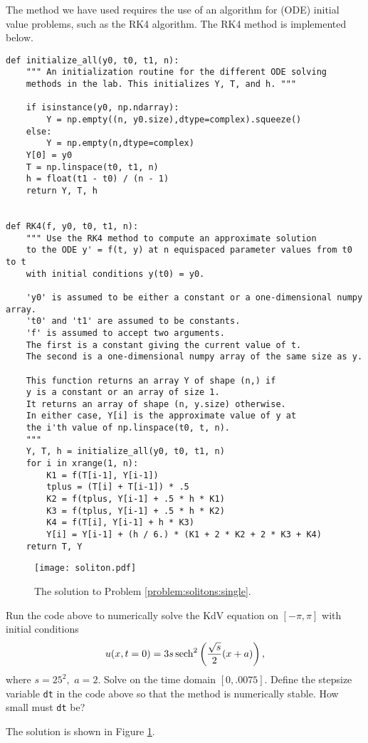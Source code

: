The method we have used requires the use of an algorithm for (ODE) initial value problems, such as the RK4 algorithm. The RK4 method is implemented below.
\begin{lstlisting}
def initialize_all(y0, t0, t1, n):
	""" An initialization routine for the different ODE solving
	methods in the lab. This initializes Y, T, and h. """
	
	if isinstance(y0, np.ndarray):
		Y = np.empty((n, y0.size),dtype=complex).squeeze()
	else:
		Y = np.empty(n,dtype=complex)
	Y[0] = y0
	T = np.linspace(t0, t1, n)
	h = float(t1 - t0) / (n - 1)
	return Y, T, h


def RK4(f, y0, t0, t1, n):
	""" Use the RK4 method to compute an approximate solution
	to the ODE y' = f(t, y) at n equispaced parameter values from t0 to t
	with initial conditions y(t0) = y0.
	
	'y0' is assumed to be either a constant or a one-dimensional numpy array.
	't0' and 't1' are assumed to be constants.
	'f' is assumed to accept two arguments.
	The first is a constant giving the current value of t.
	The second is a one-dimensional numpy array of the same size as y.
	
	This function returns an array Y of shape (n,) if
	y is a constant or an array of size 1.
	It returns an array of shape (n, y.size) otherwise.
	In either case, Y[i] is the approximate value of y at
	the i'th value of np.linspace(t0, t, n).
	"""
	Y, T, h = initialize_all(y0, t0, t1, n)
	for i in xrange(1, n):
		K1 = f(T[i-1], Y[i-1])
		tplus = (T[i] + T[i-1]) * .5
		K2 = f(tplus, Y[i-1] + .5 * h * K1)
		K3 = f(tplus, Y[i-1] + .5 * h * K2)
		K4 = f(T[i], Y[i-1] + h * K3)
		Y[i] = Y[i-1] + (h / 6.) * (K1 + 2 * K2 + 2 * K3 + K4)
	return T, Y
\end{lstlisting}

% 
% 
% 
% 
\begin{figure}
\centering
\texttt{[image: soliton.pdf]}
\caption{The solution to Problem \ref{problem:solitons:single}.}
\label{fig:solitons:single}
\end{figure}


\begin{problem}
Run the code above to numerically solve the KdV equation on $[-\pi,\pi]$ with initial conditions 
\[
u(x,t=0) = 3s\operatorname{sech}^2\left(\frac{\sqrt{s}}{2}(x+a)\right),
\]
where $s = 25^2,$ $a = 2$. Solve on the time domain $[0,.0075]$. Define the stepsize variable {\tt dt} in the code above so that the method is numerically stable.  How small must {\tt dt} be? 

The solution is shown in Figure \ref{fig:solitons:single}.
\label{problem:solitons:single}
\end{problem}


